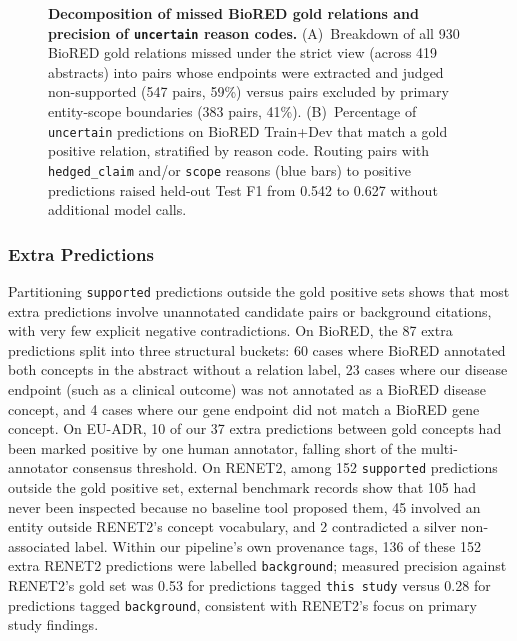 \documentclass[preprint,10pt,letterpaper]{elsarticle}
\newcommand{\st}[1]{\texttt{#1}}             %
\begin{document}
\begin{figure}[!htbp]
\centering
\resizebox{\linewidth}{!}{}
\caption{\textbf{Decomposition of missed BioRED gold relations and precision of \st{uncertain} reason codes.} (A)~Breakdown of all 930 BioRED gold relations missed under the strict view (across 419 abstracts) into pairs whose endpoints were extracted and judged non-supported (547 pairs, 59\%) versus pairs excluded by primary entity-scope boundaries (383 pairs, 41\%). (B)~Percentage of \st{uncertain} predictions on BioRED Train+Dev that match a gold positive relation, stratified by reason code. Routing pairs with \st{hedged\_claim} and/or \st{scope} reasons (blue bars) to positive predictions raised held-out Test F1 from 0.542 to 0.627 without additional model calls.}
\label{fig:recall}
\end{figure}

\subsubsection{Extra Predictions}
Partitioning \st{supported} predictions outside the gold positive sets shows that most extra predictions involve unannotated candidate pairs or background citations, with very few explicit negative contradictions. On BioRED, the 87 extra predictions split into three structural buckets: 60 cases where BioRED annotated both concepts in the abstract without a relation label, 23 cases where our disease endpoint (such as a clinical outcome) was not annotated as a BioRED disease concept, and 4 cases where our gene endpoint did not match a BioRED gene concept. On EU-ADR, 10 of our 37 extra predictions between gold concepts had been marked positive by one human annotator, falling short of the multi-annotator consensus threshold. On RENET2, among 152 \st{supported} predictions outside the gold positive set, external benchmark records show that 105 had never been inspected because no baseline tool proposed them, 45 involved an entity outside RENET2's concept vocabulary, and 2 contradicted a silver non-associated label. Within our pipeline's own provenance tags, 136 of these 152 extra RENET2 predictions were labelled \st{background}; measured precision against RENET2's gold set was 0.53 for predictions tagged \st{this study} versus 0.28 for predictions tagged \st{background}, consistent with RENET2's focus on primary study findings.
\end{document}
